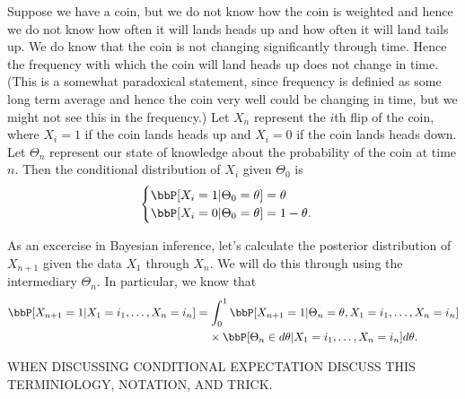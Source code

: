 \documentclass{report}
\begin{document}
\begin{example}
Suppose we have a coin, but we do not know how the coin is weighted and hence we do not know how often it will lands heads up and how often it will land tails up.  We do know that the coin is not changing significantly through time.  Hence the frequency with which the coin will land heads up does not change in time.  (This is a somewhat paradoxical statement, since frequency is definied as some long term average and hence the coin very well could be changing in time, but we might not see this in the frequency.)  Let $X_n$ represent the $i$th flip of the coin, where $X_i = 1$ if the coin lands heads up and $X_i = 0$ if the coin lands heads down.  Let $\Theta_n$ represent our state of knowledge about the probability of the coin at time $n$.  Then the conditional distribution of $X_i$ given $\Theta_0$ is
\[
\begin{cases}
\bbP[ X_i = 1 | \Theta_0 = \theta] = \theta \\
\bbP[ X_i = 0 | \Theta_0 = \theta] = 1 - \theta.
\end{cases}
\]

As an excercise in Bayesian inference, let's calculate the posterior distribution of $X_{n+1}$ given the data $X_{1}$ through $X_{n}$.  We will do this through using the intermediary $\Theta_n$.  In particular, we know that
\begin{align*}
\bbP [ X_{n+1} = 1 | X_1 = i_1 , \ldots, X_n = i_n ]
& = \int_0^1 \bbP [  X_{n+1} = 1 | \Theta_{n} = \theta , X_1 = i_1 , \ldots, X_n = i_n ] \\
& \;\;\;\; \times \bbP[ \Theta_{n} \in d\theta | X_1 = i_1, \ldots, X_n = i_n] d \theta.
\end{align*}

WHEN DISCUSSING CONDITIONAL EXPECTATION DISCUSS THIS TERMINIOLOGY, NOTATION, AND TRICK.


\end{example}
\end{document}
